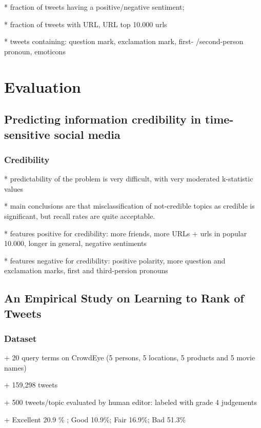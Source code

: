 \documentclass{proseminar}
\begin{document}
* fraction of tweets having a positive/negative sentiment; 

* fraction of tweets with URL, URL top 10.000 urls

* tweets containing:  question mark, exclamation mark, first- /second-person pronoun, emoticons


\section{Evaluation}
\subsection{Predicting information credibility in time-sensitive social media}

\subsubsection*{Credibility}
*  predictability of the problem is very difficult, with very moderated k-statistic values

* main conclusions are that misclassification of not-credible topics as credible is significant, but recall rates are quite acceptable.

* features positive for credibility: more friends, more URLs + urls in popular 10.000, longer in general, negative sentiments

* features negative for credibility: positive polarity, more question and exclamation marks, first and third-persion pronouns


\subsection{An Empirical Study on Learning to Rank of Tweets}
\subsubsection*{Dataset}
+ 20 query terms on CrowdEye (5 persons, 5 locations, 5 products and 5 movie names)

+ 159,298 tweets

+ 500 tweets/topic evaluated by human editor: labeled with grade 4 judgements 

+ Excellent  20.9 \% ; Good  10.9\%;  Fair 16.9\%; Bad 51.3\% 
\end{document}
